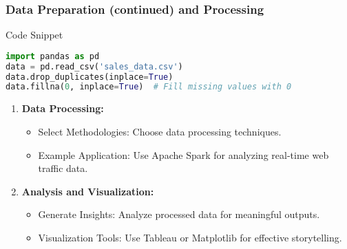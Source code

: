 \documentclass[aspectratio=169]{beamer}
\begin{document}
\begin{frame}[fragile]
    \frametitle{Data Preparation (continued) and Processing}
    \begin{block}{Code Snippet}
        \begin{lstlisting}[language=Python]
import pandas as pd
data = pd.read_csv('sales_data.csv')
data.drop_duplicates(inplace=True)
data.fillna(0, inplace=True)  # Fill missing values with 0
        \end{lstlisting}
    \end{block}

    \begin{enumerate}[resume]
        \item \textbf{Data Processing:}
        \begin{itemize}
            \item Select Methodologies: Choose data processing techniques.
            \item Example Application: Use Apache Spark for analyzing real-time web traffic data.
        \end{itemize}

        \item \textbf{Analysis and Visualization:}
        \begin{itemize}
            \item Generate Insights: Analyze processed data for meaningful outputs.
            \item Visualization Tools: Use Tableau or Matplotlib for effective storytelling.
        \end{itemize}
    \end{enumerate}
\end{frame}
\end{document}
